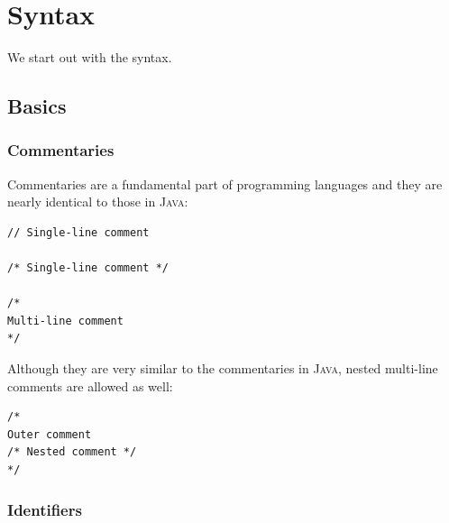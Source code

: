 \documentclass[a5paper]{report}
\def\java{\textsc{Java}\xspace}
\begin{document}

\chapter{Syntax}

We start out with the syntax.



\section{Basics}

\subsection{Commentaries}

Commentaries are a fundamental part of programming languages and they are nearly identical to those
in \java:
\begin{lstlisting}
// Single-line comment

/* Single-line comment */

/*
Multi-line comment
*/
\end{lstlisting}
Although they are very similar to the commentaries in \java, nested multi-line comments are allowed as well:
\begin{lstlisting}
/*
Outer comment
/* Nested comment */
*/
\end{lstlisting}

\subsection{Identifiers}
\end{document}
